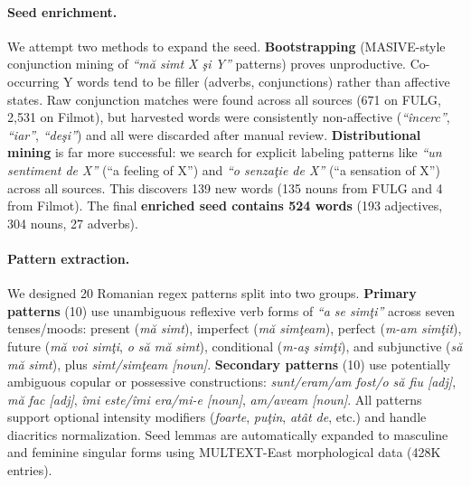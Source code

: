 \documentclass[11pt]{article}
\begin{document}
\paragraph{Seed enrichment.} We attempt two methods to expand the seed. \textbf{Bootstrapping} (MASIVE-style conjunction mining of \textit{``m\u{a} simt X \c{s}i Y''} patterns) proves unproductive. Co-occurring Y words tend to be filler (adverbs, conjunctions) rather than affective states. Raw conjunction matches were found across all sources (671 on FULG, 2,531 on Filmot), but harvested words were consistently non-affective (\textit{``\^{i}ncerc''}, \textit{``iar''}, \textit{``de\c{s}i''}) and all were discarded after manual review. \textbf{Distributional mining} is far more successful: we search for explicit labeling patterns like \textit{``un sentiment de X''} (``a feeling of X'') and \textit{``o senza\c{t}ie de X''} (``a sensation of X'') across all sources. This discovers 139 new words (135 nouns from FULG and 4 from Filmot). The final \textbf{enriched seed contains 524 words} (193 adjectives, 304 nouns, 27 adverbs).

\paragraph{Pattern extraction.} We designed 20 Romanian regex patterns split into two groups. \textbf{Primary patterns} (10) use unambiguous reflexive verb forms of \textit{``a se sim\c{t}i''} across seven tenses/moods: present (\textit{m\u{a} simt}), imperfect (\textit{m\u{a} sim\c{t}eam}), perfect (\textit{m-am sim\c{t}it}), future (\textit{m\u{a} voi sim\c{t}i}, \textit{o s\u{a} m\u{a} simt}), conditional (\textit{m-a\c{s} sim\c{t}i}), and subjunctive (\textit{s\u{a} m\u{a} simt}), plus \textit{simt/sim\c{t}eam [noun]}. \textbf{Secondary patterns} (10) use potentially ambiguous copular or possessive constructions: \textit{sunt/eram/am fost/o s\u{a} fiu [adj]}, \textit{m\u{a} fac [adj]}, \textit{\^{i}mi este/\^{i}mi era/mi-e [noun]}, \textit{am/aveam [noun]}. All patterns support optional intensity modifiers (\textit{foarte}, \textit{pu\c{t}in}, \textit{at\^{a}t de}, etc.) and handle diacritics normalization. Seed lemmas are automatically expanded to masculine and feminine singular forms using MULTEXT-East morphological data (428K entries).
\end{document}
